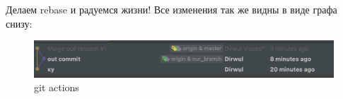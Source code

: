 \documentclass[12pt, a4paper]{article}
\begin{document}
    Делаем rebase и радуемся жизни!
    Все изменения так же видны в виде графа снизу:

    \begin{figure}[H]
        \centering
        \includegraphics[width=0.75\linewidth]{src/gitactions.png}
        \caption{git actions}
    \end{figure}
\end{document}
